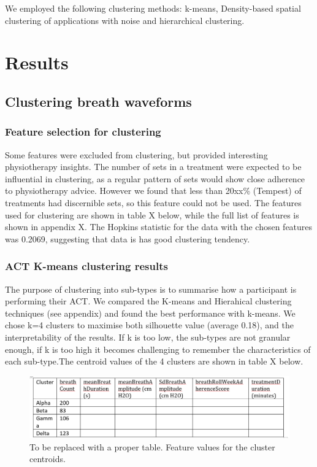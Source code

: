 \documentclass{article}
\begin{document}
We employed the following clustering methods: k-means, Density-based spatial clustering of applications with noise and hierarchical clustering.  

\section{Results}

\subsection{Clustering breath waveforms}

\subsubsection{Feature selection for clustering}

Some features were excluded from clustering, but provided interesting physiotherapy insights.  
The number of sets in a treatment were expected to be influential in clustering, as a regular pattern of sets would show close adherence to physiotherapy advice. However we found that less than 20xx\% (Tempest) of treatments had discernible sets, so this feature could not be used. The features used for clustering are shown in table X below, while the full list of features is shown in appendix X. The Hopkins statistic for the data with the chosen features was 0.2069, suggesting  that data is has good clustering tendency. 

\subsubsection{ACT K-means clustering results}
The purpose of clustering into sub-types is to summarise how a participant is performing their ACT. We compared the K-means and Hierahical clustering techniques (see appendix) and found the best performance with k-means.  We chose k=4 clusters to maximise both silhouette value (average 0.18), and the interpretability of the results. If k is too low, the sub-types are not granular enough, if k is too high it becomes challenging to remember the characteristics of each sub-type.The centroid values of the 4 clusters are shown in table X below.

\begin{figure}[!htb]
  \centering
  \includegraphics[width=\textwidth]{featureTables.png}
  \caption{To be replaced with a proper table. Feature values for the cluster centroids.}
\end{figure}
\end{document}
